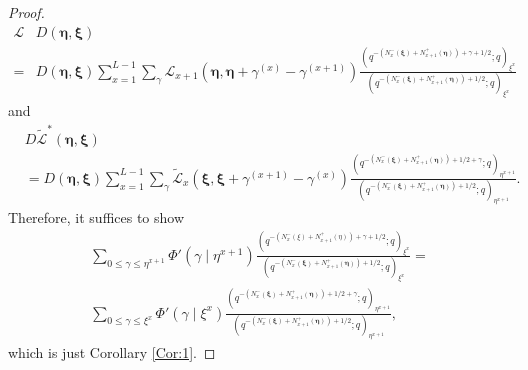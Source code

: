 \documentclass{ximera}
\begin{document}
\begin{proof}
\begin{align*}
\mathcal{L}&D(\boldsymbol\eta,\boldsymbol\xi) \\= & D(\boldsymbol\eta,\boldsymbol\xi)\sum_{x=1}^{L-1}\sum_{\gamma}\mathcal{L}_{x+1}(\boldsymbol\eta,\boldsymbol\eta+\gamma^{(x)}-\gamma^{(x+1)})\frac{\left(q^{-\left(N_{x}^-(\boldsymbol\xi)+N_{x+1}^+(\boldsymbol\eta)\right)+\gamma+1/2};q\right)_{\xi^x}}{\left(q^{-\left(N_{x}^-(\boldsymbol\xi)+N_{x+1}^+(\boldsymbol\eta)\right)+1/2};q\right)_{\xi^x}} 
\end{align*}
and
\begin{align*}
    & D\tilde{\mathcal{L}}^*(\boldsymbol\eta,\boldsymbol\xi) \\ & =D(\boldsymbol\eta,\boldsymbol\xi)\sum_{x=1}^{L-1}\sum_{\gamma}\mathcal{\tilde{L}}_{x}(\boldsymbol\xi,\boldsymbol\xi+\gamma^{(x+1)}-\gamma^{(x)})\frac{\left(q^{-\left(N_{x}^-(\boldsymbol\xi)+N_{x+1}^+(\boldsymbol\eta)\right)+1/2+\gamma};q\right)_{\eta^{x+1}}}{\left(q^{-\left(N_{x}^-(\boldsymbol\xi)+N_{x+1}^+(\boldsymbol\eta)\right)+1/2};q\right)_{\eta^{x+1}}}.
\end{align*}
Therefore, it suffices to show 
\begin{multline*}
   \sum_{0\le \gamma\le \eta^{x+1}}\Phi'(\gamma\mid\eta^{x+1})\frac{\left(q^{-\left(N_{x}^-(\xi)+N_{x+1}^+(\eta)\right)+\gamma+1/2};q\right)_{\xi^x}}{\left(q^{-\left(N_{x}^-(\boldsymbol\xi)+N_{x+1}^+(\boldsymbol\eta)\right)+1/2};q\right)_{\xi^x}} =\\
    \sum_{0\le \gamma\le \xi^{x}}\Phi'(\gamma\mid\xi^{x})\frac{\left(q^{-\left(N_{x}^-(\boldsymbol\xi)+N_{x+1}^+(\boldsymbol\eta)\right)+1/2+\gamma};q\right)_{\eta^{x+1}}}{\left(q^{-\left(N_{x}^-(\boldsymbol\xi)+N_{x+1}^+(\boldsymbol\eta)\right)+1/2};q\right)_{\eta^{x+1}}},
\end{multline*}
which is just Corollary \ref{Cor:1}.


\end{proof}
\end{document}
